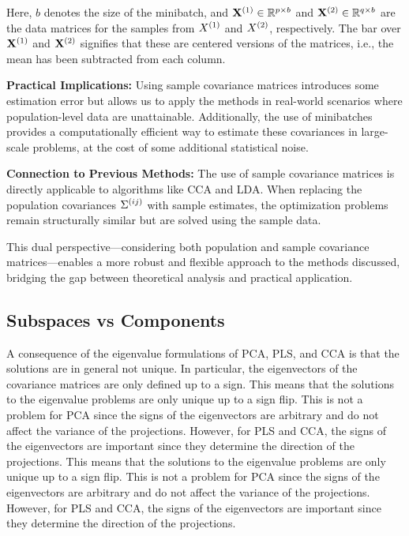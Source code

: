 Here, \(b\) denotes the size of the minibatch, and \(\mathbf{X}^{(1)} \in \mathbb{R}^{p \times b}\) and \(\mathbf{X}^{(2)} \in \mathbb{R}^{q \times b}\) are the data matrices for the samples from \(X^{(1)}\) and \(X^{(2)}\), respectively. The bar over \(\mathbf{X}^{(1)}\) and \(\mathbf{X}^{(2)}\) signifies that these are centered versions of the matrices, i.e., the mean has been subtracted from each column.

\textbf{Practical Implications:} Using sample covariance matrices introduces some estimation error but allows us to apply the methods in real-world scenarios where population-level data are unattainable. Additionally, the use of minibatches provides a computationally efficient way to estimate these covariances in large-scale problems, at the cost of some additional statistical noise.

\textbf{Connection to Previous Methods:} The use of sample covariance matrices is directly applicable to algorithms like CCA and LDA. When replacing the population covariances \(\Sigma^{(ij)}\) with sample estimates, the optimization problems remain structurally similar but are solved using the sample data.

This dual perspective—considering both population and sample covariance matrices—enables a more robust and flexible approach to the methods discussed, bridging the gap between theoretical analysis and practical application.

\subsection{Subspaces vs Components}

A consequence of the eigenvalue formulations of PCA, PLS, and CCA is that the solutions are in general not unique.
In particular, the eigenvectors of the covariance matrices are only defined up to a sign.
This means that the solutions to the eigenvalue problems are only unique up to a sign flip.
This is not a problem for PCA since the signs of the eigenvectors are arbitrary and do not affect the variance of the projections.
However, for PLS and CCA, the signs of the eigenvectors are important since they determine the direction of the projections.
This means that the solutions to the eigenvalue problems are only unique up to a sign flip.
This is not a problem for PCA since the signs of the eigenvectors are arbitrary and do not affect the variance of the projections.
However, for PLS and CCA, the signs of the eigenvectors are important since they determine the direction of the projections.

